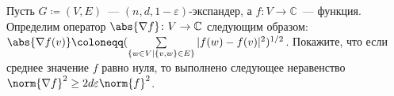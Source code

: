 Пусть $G \coloneqq (V, E)$~--- $(n, d, 1 - \varepsilon)$-экспандер, а $f \colon V \rightarrow
\mathbb{C}$~--- функция. Определим оператор $\abs{\nabla f} \colon V \rightarrow \mathbb{C}$
следующим образом: $\abs{\nabla f(v)} \coloneqq
(\sum\limits_{\{w \in V \mid \{v, w\} \in E\}} |f(w) - f(v)|^2)^{1 / 2}$. Покажите, что если среднее
значение $f$ равно нуля, то выполнено следующее неравенство $\norm{\nabla f}^2 \ge
2 d \varepsilon \norm{f}^2$.
